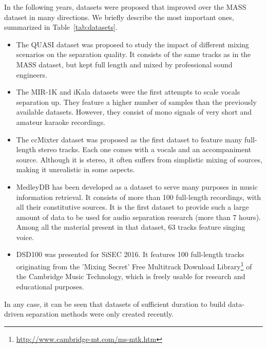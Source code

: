 In the following years, datasets were proposed that improved over the MASS dataset in many directions. We briefly describe the most important ones, summarized in Table~\ref{tab:datasets}.
\begin{itemize}[leftmargin=*]
	\item The QUASI dataset was proposed to study the impact of different mixing scenarios on the separation quality. It  consists of the same tracks as in the MASS dataset, but kept full length and mixed by professional sound engineers.
	\item The MIR-1K and iKala datasets were the first attempts to scale vocals separation up. They feature a higher number of samples than the previously available datasets. However, they consist of mono signals of very short and amateur karaoke recordings.
	\item The ccMixter dataset was proposed as the first dataset to feature many full-length stereo tracks. Each one comes with a vocals and an accompaniment source. Although it is stereo, it often suffers from simplistic mixing of sources, making it unrealistic in some aspects.
	\item MedleyDB has been developed as a dataset to serve many purposes in music information retrieval. It consists of more than 100 full-length recordings, with all their constitutive sources. It is the first dataset to provide such a large amount of data to be used for audio separation research (more than 7 hours). Among all the material present in that dataset, 63 tracks feature singing voice.
  \item DSD100 was presented for SiSEC 2016. It features 100 full-length tracks originating from the 'Mixing Secret' Free Multitrack Download Library\footnote{\url{http://www.cambridge-mt.com/ms-mtk.htm}} of the Cambridge Music Technology, which is freely usable for research and educational purposes.
\end{itemize}

In any case, it can be seen that datasets of sufficient duration to build data-driven separation methods were only created recently.

